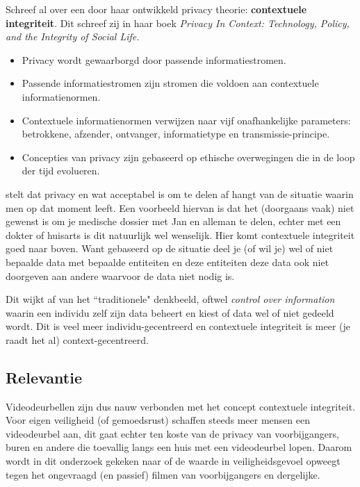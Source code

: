 \documentclass[nonacm, sigconf]{acmart}
\begin{document}
    \parencite{nissenbaum2009privacy} Schreef al over een door haar ontwikkeld privacy theorie: \textbf{contextuele integriteit}.
    Dit schreef zij in haar boek \textit{Privacy In Context: Technology, Policy, and the Integrity of Social Life.}

    \vsmall
    \begin{itemize}
        \item Privacy wordt gewaarborgd door passende informatiestromen.
        \item Passende informatiestromen zijn stromen die voldoen aan contextuele informatienormen.
        \item Contextuele informatienormen verwijzen naar vijf onafhankelijke parameters: betrokkene, afzender, ontvanger, informatietype en transmissie-principe.
        \item Concepties van privacy zijn gebaseerd op ethische overwegingen die in de loop der tijd evolueren.
    \end{itemize}
    \vsmall

    \citeauthor{nissenbaum2009privacy} stelt dat privacy en wat acceptabel is om te delen af hangt van de situatie waarin men op dat moment leeft.
    Een voorbeeld hiervan is dat het (doorgaans vaak) niet gewenst is om je medische dossier met Jan en alleman te delen, echter met een dokter of huisarts is dit natuurlijk wel wenselijk.
    Hier komt contextuele integriteit goed naar boven.
    Want gebaseerd op de situatie deel je (of wil je) wel of niet bepaalde data met bepaalde entiteiten en deze entiteiten deze data ook niet doorgeven aan andere waarvoor de data niet nodig is.

    Dit wijkt af van het ``traditionele" denkbeeld, oftwel \textit{control over information} waarin een individu zelf zijn data beheert en kiest of data wel of niet gedeeld wordt.
    Dit is veel meer individu-gecentreerd en contextuele integriteit is meer (je raadt het al) context-gecentreerd.

    \subsection{Relevantie}
    Videodeurbellen zijn dus nauw verbonden met het concept contextuele integriteit.
    Voor eigen veiligheid (of gemoedsrust) schaffen steeds meer mensen een videodeurbel aan, dit gaat echter ten koste van de privacy van voorbijgangers, buren en andere die toevallig langs een huis met een videodeurbel lopen.
    Daarom wordt in dit onderzoek gekeken naar of de waarde in veiligheidsgevoel opweegt tegen het ongevraagd (en passief) filmen van voorbijgangers en dergelijke.
\end{document}
